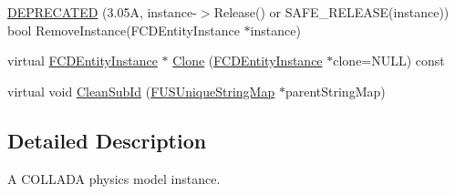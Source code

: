 \begin{DoxyCompactItemize}
\item 
\hyperlink{classFCDPhysicsModelInstance_ade18370226bfc59d2f62db463b508259}{DEPRECATED} (3.05A, instance-\/$>$Release() or SAFE\_\-RELEASE(instance)) bool RemoveInstance(FCDEntityInstance $\ast$instance)
\item 
virtual \hyperlink{classFCDEntityInstance}{FCDEntityInstance} $\ast$ \hyperlink{classFCDPhysicsModelInstance_a701959f01ffd8e0b2be6d4318d665dc0}{Clone} (\hyperlink{classFCDEntityInstance}{FCDEntityInstance} $\ast$clone=NULL) const 
\item 
virtual void \hyperlink{classFCDPhysicsModelInstance_a5d69b58ff479dc0006dc92e4689b557e}{CleanSubId} (\hyperlink{classFUUniqueStringMapT}{FUSUniqueStringMap} $\ast$parentStringMap)
\end{DoxyCompactItemize}


\subsection{Detailed Description}
A COLLADA physics model instance. 

